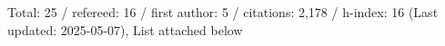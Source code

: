 Total: 25 / refereed: 16 / first author: 5 / citations: 2,178 / h-index: 16 (Last updated: 2025-05-07), List attached below